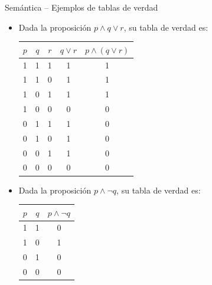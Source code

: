\documentclass[dvisvgm,hypertex,aspectratio=169]{beamer}
\begin{document}
\begin{frame}{Semántica -- Ejemplos de tablas de verdad}
  \begin{itemize}[<+->]
    \item Dada la proposición $p \land q \lor r$, su tabla de verdad es:
    \begin{table}[h]
      \centering
      \begin{tabular}{|c|c|c|c|c|}
        \hline
        $p$ & $q$ & $r$ & $q \lor r$ & $p \land (q \lor r)$ \\ \hline
        1 & 1 & 1 & 1 & 1 \\ \hline
        1 & 1 & 0 & 1 & 1 \\ \hline
        1 & 0 & 1 & 1 & 1 \\ \hline
        1 & 0 & 0 & 0 & 0 \\ \hline
        0 & 1 & 1 & 1 & 0 \\ \hline
        0 & 1 & 0 & 1 & 0 \\ \hline
        0 & 0 & 1 & 1 & 0 \\ \hline
        0 & 0 & 0 & 0 & 0 \\ \hline
      \end{tabular}
    \end{table}
    \item Dada la proposición $p \land \neg q$, su tabla de verdad es:
    \begin{table}[h]
      \centering
      \begin{tabular}{|c|c|c|}
        \hline
        $p$ & $q$ & $p \land \neg q$ \\ \hline
        1 & 1 & 0 \\ \hline
        1 & 0 & 1 \\ \hline
        0 & 1 & 0 \\ \hline
        0 & 0 & 0 \\ \hline
      \end{tabular}
    \end{table}
  \end{itemize}
\end{frame}
\end{document}
